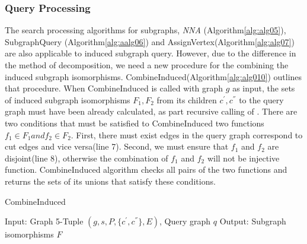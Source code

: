 \subsubsection{Query Processing}
The search processing algorithms for subgraphs, \textit{NNA} (Algorithm\ref{alg:alg05}), SubgraphQuery (Algorithm\ref{alg:aalg06}) and AssignVertex(Algorithm\ref{alg:alg07}) are also applicable to induced subgraph query. However, due to the difference in the method of decomposition, we need a new procedure for the combining the 
induced subgraph isomorphisms. CombineInduced(Algorithm\ref{alg:alg010}) outlines that procedure.
When CombineInduced is called with graph $g$ as input, the sets of induced subgraph isomorphisms $F_1, F_2$ from its children $c^{'}, c^{''}$ 
to the query graph must have been already calculated, as part recursive calling of \label{alg:aalg06}.
There are two conditions that must be satisfied to CombineInduced two functions $f_1 \in F_1 and f_2 \in F_2$.
First, there must exist edges in the query graph correspond to cut edges and vice versa(line 7).
Second, we must ensure that $f_1$ and $f_2$ are disjoint(line 8), otherwise the combination of $f_1$ and $f_2$ will not be injective function.
CombineInduced algorithm checks all pairs of the two functions and returns the sets of its unions that satisfy these conditions.

\begin{algorithm}[t]
\caption{CombineInduced}
\label{alg:alg010}
\begin{algorithmic}
\STATE Input:  Graph 5-Tuple $(g,s,P,\{c^{'},c^{''}\},E)$, Query graph $q$
\STATE Output: Subgraph isomorphisms $F$
\end{algorithmic}
\begin{algorithmic}[1]
\STATE $F_1 \leftarrow$CombineInduced$(c^{'},s_1 ,P_1 ,\{c_1^{'},c_1^{''}\},E_1 ,q)$
\STATE $F_2 \leftarrow$CombineInduced$(c^{''},s_2 ,P_2 ,\{c_2^{'},c_2^{''}\},E_2 ,q)$
\STATE $F \leftarrow \emptyset$
\STATE $E \leftarrow E_g - (E_1 \cup E_2 )$
                                \STATE $g \leftarrow (c^{'} \cup_{E} c^{''})$
                                \STATE $V_{g} \leftarrow f(V_{c^{'}} \cup V_{c^{''}} })$
                                \STATE $F \leftarrow  F \cup \{ f \} $
		\ENDIF
	\ENDIF
\ENDFOR
\RETURN $F$
\end{algorithmic}
\end{algorithm}

